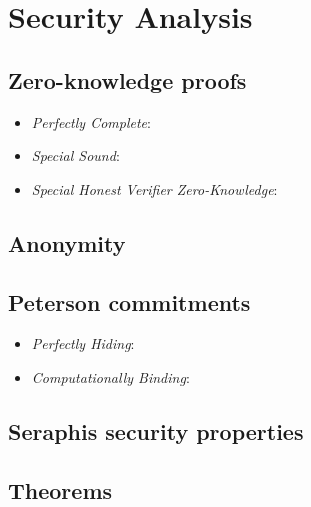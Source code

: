 \documentclass{article}
\begin{document}
\section{Security Analysis}
\subsection{Zero-knowledge proofs}
\begin{itemize}
    \item \textit{Perfectly Complete}:
    \item \textit{Special Sound}:
    \item \textit{Special Honest Verifier Zero-Knowledge}:
\end{itemize}
\subsection{Anonymity}
\subsection{Peterson commitments}
\begin{itemize}
    \item \textit{Perfectly Hiding}:
    \item \textit{Computationally Binding}:
\end{itemize}
\subsection{Seraphis security properties}
\subsection{Theorems}



\end{document}
